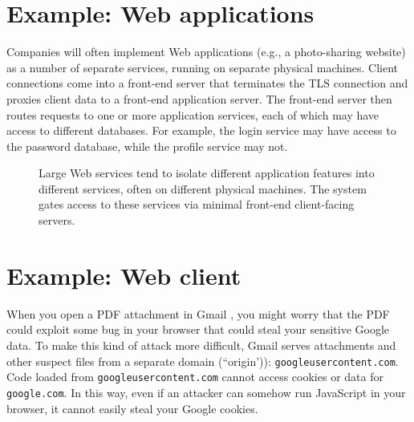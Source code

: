 \documentclass[
  letterpaper,
]{scrbook}
\theoremstyle{definition}
\theoremstyle{plain}
\theoremstyle{plain}
\theoremstyle{remark}
\begin{document}
\section{Example: Web applications}\label{example-web-applications}

Companies will often implement Web applications (e.g., a photo-sharing
website) as a number of separate services, running on separate physical
machines. Client connections come into a front-end server that
terminates the TLS connection and proxies client data to a front-end
application server. The front-end server then routes requests to one or
more application services, each of which may have access to different
databases. For example, the login service may have access to the
password database, while the profile service may not.

\begin{figure}


\caption{\label{fig-web-services}Large Web services tend to isolate
different application features into different services, often on
different physical machines. The system gates access to these services
via minimal front-end client-facing servers.}

\end{figure}%

\section{Example: Web client}\label{example-web-client}

When you open a PDF attachment in Gmail , you might worry that the PDF
could exploit some bug in your browser that could steal your sensitive
Google data. To make this kind of attack more difficult, Gmail serves
attachments and other suspect files from a separate domain (``origin')):
\texttt{googleusercontent.com}. Code loaded from
\texttt{googleusercontent.com} cannot access cookies or data for
\texttt{google.com}. In this way, even if an attacker can somehow run
JavaScript in your browser, it cannot easily steal your Google cookies.
\end{document}
